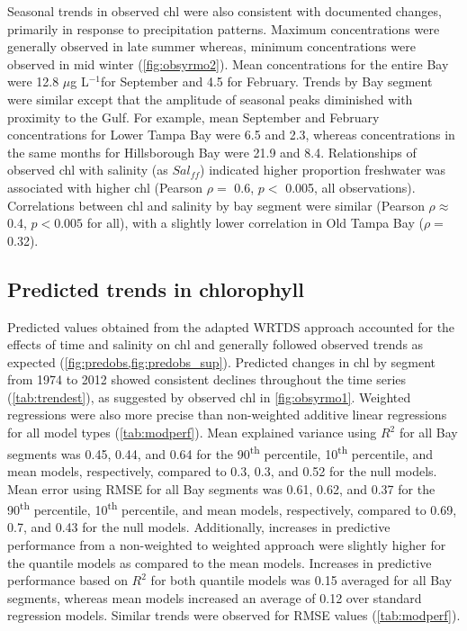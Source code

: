 \documentclass{svjour3}\usepackage[]{graphicx}\usepackage[]{color}
\newcommand{\mugl}{$\mu$g L$^{-1}$}
\begin{document}
Seasonal trends in observed \ac{chl} were also consistent with documented changes, primarily in response to precipitation patterns.  Maximum concentrations were generally observed in late summer whereas, minimum concentrations were observed in mid winter (\cref{fig:obsyrmo2}).  Mean concentrations for the entire Bay were 12.8 \mugl for September and 4.5 for February.  Trends by Bay segment were similar except that the amplitude of seasonal peaks diminished with proximity to the Gulf.  For example, mean September and February concentrations for Lower Tampa Bay were 6.5 and 2.3, whereas concentrations in the same months for Hillsborough Bay were 21.9 and 8.4.  Relationships of observed \ac{chl} with salinity (as $Sal_{ff}$) indicated higher proportion freshwater was associated with higher \ac{chl} (Pearson $\rho=$ 0.6, $p<$ 0.005, all observations).  Correlations between \ac{chl} and salinity by bay segment were similar (Pearson $\rho \approx$ 0.4, $p<0.005$ for all), with a slightly lower correlation in Old Tampa Bay ($\rho=$ 0.32).

\subsection{Predicted trends in chlorophyll}

Predicted values obtained from the adapted \ac{WRTDS} approach accounted for the effects of time and salinity on \ac{chl} and generally followed observed trends as expected (\cref{fig:predobs,fig:predobs_sup}).  Predicted changes in \ac{chl} by segment from 1974 to 2012 showed consistent declines throughout the time series (\cref{tab:trendest}), as suggested by observed \ac{chl} in \cref{fig:obsyrmo1}.  Weighted regressions were also more precise than non-weighted additive linear regressions for all model types (\cref{tab:modperf}).   Mean explained variance using $R^2$ for all Bay segments was 0.45, 0.44, and 0.64 for the 90\textsuperscript{th} percentile, 10\textsuperscript{th} percentile, and mean models, respectively, compared to 0.3, 0.3, and 0.52 for the null models.  Mean error using \ac{RMSE} for all Bay segments was 0.61, 0.62, and 0.37 for the 90\textsuperscript{th} percentile, 10\textsuperscript{th} percentile, and mean models, respectively, compared to 0.69, 0.7, and 0.43 for the null models.  Additionally, increases in predictive performance from a non-weighted to weighted approach were slightly higher for the quantile models as compared to the mean models.  Increases in predictive performance based on $R^2$ for both quantile models was 0.15 averaged for all Bay segments, whereas mean models increased an average of 0.12 over standard regression models. Similar trends were observed for \ac{RMSE} values (\cref{tab:modperf}).    
\end{document}
